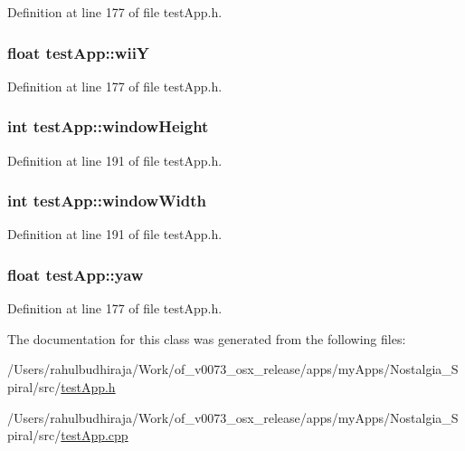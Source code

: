 Definition at line 177 of file test\-App.\-h.

\hypertarget{classtest_app_a5ae41896388ae16ee530beca5333e02a}{
\subsubsection[{wii\-Y}]{\setlength{\rightskip}{0pt plus 5cm}float test\-App\-::wii\-Y}}\label{classtest_app_a5ae41896388ae16ee530beca5333e02a}


Definition at line 177 of file test\-App.\-h.

\hypertarget{classtest_app_a4e8884eeef5b2657b62278969d4e3dcf}{
\subsubsection[{window\-Height}]{\setlength{\rightskip}{0pt plus 5cm}int test\-App\-::window\-Height}}\label{classtest_app_a4e8884eeef5b2657b62278969d4e3dcf}


Definition at line 191 of file test\-App.\-h.

\hypertarget{classtest_app_a9ed611377cd46f5148a3a3d538e96484}{
\subsubsection[{window\-Width}]{\setlength{\rightskip}{0pt plus 5cm}int test\-App\-::window\-Width}}\label{classtest_app_a9ed611377cd46f5148a3a3d538e96484}


Definition at line 191 of file test\-App.\-h.

\hypertarget{classtest_app_a865985f78dd5def3ed20c87b9fc772b6}{
\subsubsection[{yaw}]{\setlength{\rightskip}{0pt plus 5cm}float test\-App\-::yaw}}\label{classtest_app_a865985f78dd5def3ed20c87b9fc772b6}


Definition at line 177 of file test\-App.\-h.



The documentation for this class was generated from the following files\-:\begin{DoxyCompactItemize}
\item 
/\-Users/rahulbudhiraja/\-Work/of\-\_\-v0073\-\_\-osx\-\_\-release/apps/my\-Apps/\-Nostalgia\-\_\-\-Spiral/src/\hyperlink{test_app_8h}{test\-App.\-h}\item 
/\-Users/rahulbudhiraja/\-Work/of\-\_\-v0073\-\_\-osx\-\_\-release/apps/my\-Apps/\-Nostalgia\-\_\-\-Spiral/src/\hyperlink{test_app_8cpp}{test\-App.\-cpp}\end{DoxyCompactItemize}
